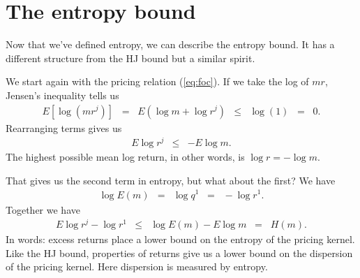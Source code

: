 \documentclass[11pt]{article}
\begin{document}
\section{The entropy bound}

Now that we've defined entropy, we can describe the entropy bound.
It has a different structure from the HJ bound but a similar spirit.

We start again with the pricing relation (\ref{eq:foc}).
If we take the log of $mr$, Jensen's inequality tells us
\begin{eqnarray*}
    E \left[ \log ( m r^j )\right]
        \;\;=\;\; E \left( \log m + \log r^j \right)
        &\leq& \log (1) \;\;=\;\; 0 .
\end{eqnarray*}
Rearranging terms gives us
\begin{eqnarray*}
    E  \log r^j  &\leq& - E \log m . %
\end{eqnarray*}
The highest possible mean log return, in other words, is $\log r = - \log m$.


That gives us the second term in entropy, but what about the first?
We have
\begin{eqnarray*}
     \log E (m)  &=& \log q^1 \;\;=\;\; - \log r^1 .
\end{eqnarray*}
Together we have
\begin{eqnarray}
    E  \log r^j - \log r^1  &\leq& \log E(m) - E \log m  \;\;=\;\; H(m) .
    \label{eq:entropy-bound}
\end{eqnarray}
In words: excess returns place a lower bound on the entropy
of the pricing kernel.
Like the HJ bound, properties of returns give us a lower bound
on the dispersion of the pricing kernel.
Here dispersion is measured by entropy.
\end{document}
